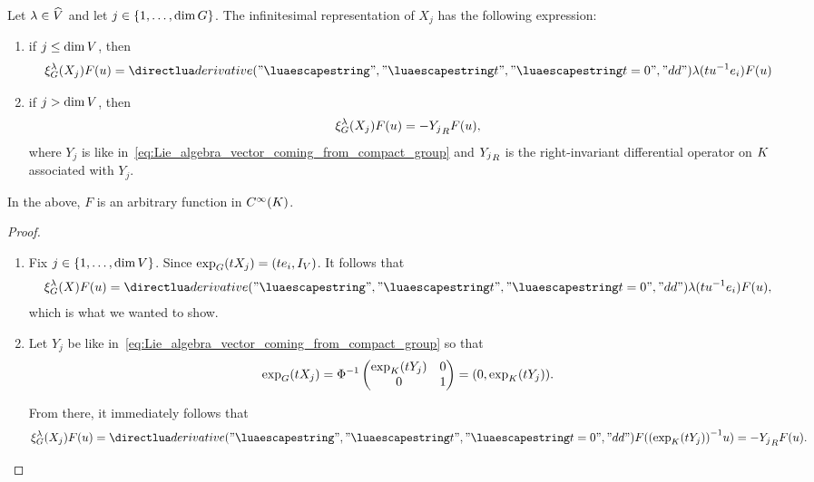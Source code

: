 \begin{proposition}
    Let $\lambda \in {\widehat{V}}$ and let $j \in \{1, \dots, \dim G\}$.
    The infinitesimal representation of $X_j$ has the following expression:
    \begin{enumerate}
        \item if $j \leq \dim V$, then
            \begin{align*}
                \Rep{\lambda}(X_j) F(u) = \D*{t}<t = 0> \lambda(t u^{-1} e_i) F(u)
            \end{align*}
        \item if $j > \dim V$, then
            \begin{align*}
                \xi^{\lambda}_G(X_j) F(u) = -{Y_j}_R F(u),
            \end{align*}
            where $Y_j$ is like in~\eqref{eq:Lie_algebra_vector_coming_from_compact_group} and
            ${Y_j}_R$ is the right-invariant differential operator on $K$ associated with $Y_j$.
    \end{enumerate}
    In the above, $F$ is an arbitrary function in ${C^\infty(K)}$.
\end{proposition}
\begin{proof}
    \begin{enumerate}
        \item Fix $j \in \{1, \dots, \dim V\}$.
            Since $\exp_G(t X_j) = (t e_i, {I_{V}})$.
            It follows that
            \begin{align*}
                \Rep{\lambda}(X) F(u) = \D*{t}<t = 0> \lambda(t u^{-1} e_i) F(u),
            \end{align*}
            which is what we wanted to show.
        \item Let $Y_j$ be like in~\eqref{eq:Lie_algebra_vector_coming_from_compact_group} so that
            \begin{align*}
                \exp_G(t X_j) = \Phi^{-1}
                    \begin{pmatrix}
                        \exp_K(t Y_j) & 0\\
                        0 & 1
                    \end{pmatrix}
                    = (0, \exp_K(t Y_j)).
            \end{align*}

            From there, it immediately follows that
            \begin{align*}
                \Rep{\lambda}(X_j) F(u)
                = \D*{t}<t = 0> F({(\exp_\CompactGroup(t Y_j))}^{-1} u)
                = -\RightDifferentialOperatorFirstOrder{Y_j} F(u).
            \end{align*}
    \end{enumerate}
\end{proof}

